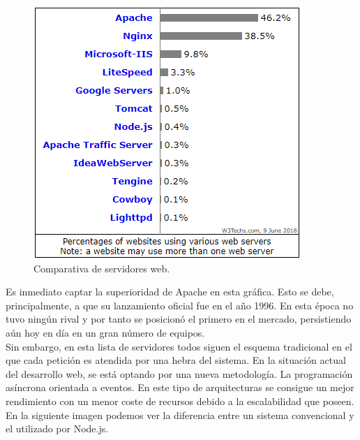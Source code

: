 \begin{figure}[H]
	\centering
	\includegraphics[scale=0.8]{imagenes/web-servers-comparison.png}
	\caption{Comparativa de servidores web.\cite{web-server-usage} \label{fig:figura2}}
\end{figure}

Es inmediato captar la superioridad de Apache\cite{apache} en esta gráfica. Esto se debe, principalmente, a que su lanzamiento 
oficial fue en el año 1996. En esta época no tuvo ningún rival y por tanto se posicionó el primero en el mercado, 
persistiendo aún hoy en día en un gran número de equipos.\\

Sin embargo, en esta lista de servidores todos siguen el esquema tradicional en el que cada petición es atendida 
por una hebra del sistema. En la situación actual del desarrollo web, se está optando por una nueva metodología. La programación
asíncrona orientada a eventos. En este tipo de arquitecturas se consigue un mejor rendimiento con un menor coste 
de recursos debido a la escalabilidad que poseen. \\

En la siguiente imagen podemos ver la diferencia entre un sistema convencional y el utilizado por Node.js\cite{nodejs}.


